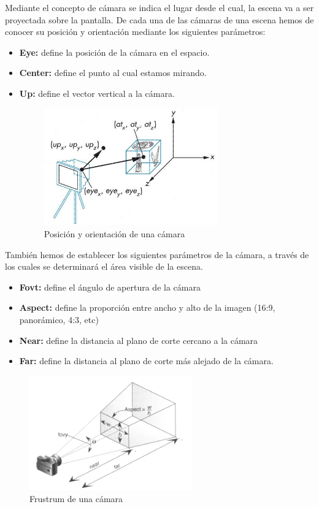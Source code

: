 Mediante el concepto de cámara se indica el lugar desde el cual, la escena va a ser proyectada sobre la pantalla. De cada una de las cámaras de una escena hemos de conocer su posición y orientación mediante los siguientes parámetros:
\begin{itemize}
	\item  \textbf{Eye:} define la posición de la cámara en el espacio.
         \item  \textbf{Center:} define el punto al cual estamos mirando.
         \item  \textbf{Up:} define el vector vertical a la cámara.
	\begin{figure}[!h]
		\centering
	         	 \includegraphics[width=7.5cm]{img/glulookat.jpg}
		\caption{Posición y orientación de una cámara}
	\end{figure}
\end{itemize}

También hemos de establecer los siguientes parámetros de la cámara, a través de los cuales se determinará el área visible de la escena. 
\begin{itemize}
\item  \textbf{Fovt:} define el ángulo de apertura de la cámara 
\item  \textbf{Aspect:} define la proporción entre ancho y alto de la imagen (16:9, panorámico, 4:3, etc)
\item \textbf{ Near:} define la distancia al plano de corte cercano a la cámara
\item  \textbf{Far:} define la distancia al plano de corte más alejado de la cámara.
\end{itemize}
\begin{figure}[!h]
	\centering
	          \includegraphics[width=7cm]{img/gluperspective.png}
	\caption{Frustrum de una cámara}
\end{figure}

